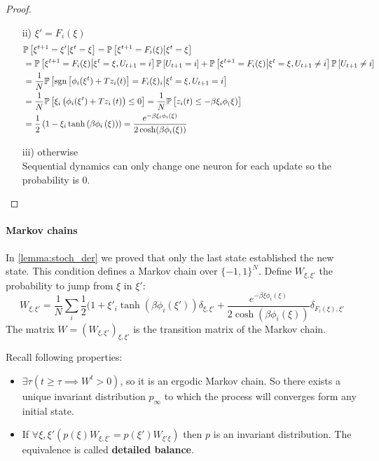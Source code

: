 \begin{lemma}
\begin{proof}
\begin{itemize}
        \item[ii)] $\xi' = F_i(\xi)$
        \begin{align*}
            &\mathbb{P}\left[\xi^{t+1}=\xi'\middle|\xi^t=\xi\right]
            = \mathbb{P}\left[\xi^{t+1}=F_i(\xi)\middle|\xi^t=\xi\right] \\
            &= \mathbb{P}\left[\xi^{t+1}=F_i(\xi)\middle|\xi^t=\xi, U_{t+1}=i\right]\mathbb{P}\left[U_{t+1}=i\right] + \mathbb{P}\left[\xi^{t+1}=F_i(\xi)\middle|\xi^t=\xi, U_{t+1}\neq i\right]\mathbb{P}\left[U_{t+1}\neq i\right]\\
            &= \frac{1}{N} \mathbb{P}\left[ \operatorname{sgn}\left[\phi_i(\xi^t) + Tz_i(t) \right] = F_i(\xi)_i\middle| \xi^t=\xi, U_{t+1}=i\right] \\
            &= \frac{1}{N}  \mathbb{P}\left[ \xi_i\left(\phi_i(\xi^t) + Tz_i\left(t\right) \right) \leq 0 \right]
            = \frac{1}{N} \mathbb{P}\left[z_i(t) \leq - \beta \xi_i \phi_(\xi) \right] \\
            &= \frac{1}{2} \left(1 - \xi_i \tanh\left(\beta \phi_i\left(\xi \right)\right)\right) = \frac{e^{-\beta \xi_i \phi_i(\xi)}}{2\cosh(\beta\phi_i(\xi))}
        \end{align*}
        \item[iii)] otherwise\\
        Sequential dynamics can only change one neuron for each update so the probability is $0$.
    \end{itemize}

    \end{proof}
\end{lemma}

\paragraph{Markov chains} In \cref{lemma:stoch_der} we proved that only the last state established the new state. This condition defines a Markov chain over $\{-1,1\}^N$. Define $W_{\xi,\xi'}$ the probability to jump from $\xi$ in $\xi'$:
\[
    W_{\xi,\xi'} =
        \frac{1}{N}\sum_i \frac{1}{2} (1 + \xi'_i \tanh(\beta \phi_i(\xi' )) \delta_{\xi,\xi'} + \frac{e^{-\beta \xi \phi_i(\xi)}}{2\cosh(\beta\phi_i(\xi))} \delta_{F_i(\xi),\xi'}
\]
The matrix $W=\left(W_{\xi,\xi'}\right)_{\xi,\xi'}$ is the transition matrix of the Markov chain.

\begin{remark}
    Recall following properties:
    \begin{itemize}[itemsep=2pt, topsep=5pt]
        \item $\exists\tau\left(t\geq\tau\implies W^t > 0\right)$, so it is an ergodic Markov chain. So there exists a unique invariant distribution $p_{\infty}$ to which the process will converges form any initial state.
        \item If $\forall \xi,\xi'\left(p(\xi) W_{\xi,\xi'} = p(\xi') W_{\xi'\xi}\right)$ then $p$ is an invariant distribution. The equivalence is called \textbf{detailed balance}.
    \end{itemize}
\end{remark}

